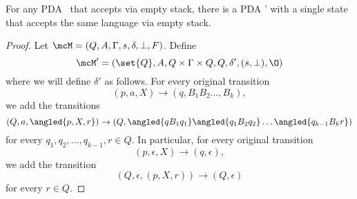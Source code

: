 \begin{lemma}
    For any PDA \mcM\ that accepts via empty stack, there is a PDA \mcM'
    with a single state that accepts the same language via empty stack.
\end{lemma}
\begin{proof}
    Let $\mcM = (Q, A, \Gamma, s, \delta, \bot, F)$.
    Define \[
        \mcM' = (\set{Q}, A, Q \times \Gamma \times Q, Q, \delta', (s, \bot), \O)
    \] where we will define $\delta'$ as follows.
    For every original transition \[
        (p, a, X) \to (q, B_1 B_2 \dots, B_k),
    \] we add the transitions \[
        (Q, a, \angled{p, X, r}) \to (Q, \angled{q B_1 q_1}\angled{q_1 B_2 q_2}\dots\angled{q_{k-1} B_k r})
    \] for every $q_1, q_2, \dots, q_{k-1}, r \in Q$.
    In particular, for every original transition \[
        (p, \epsilon, X) \to (q, \epsilon),
    \] we add the transition \[
        (Q, \epsilon, (p, X, r)) \to (Q, \epsilon)
    \] for every $r \in Q$.
\end{proof}
